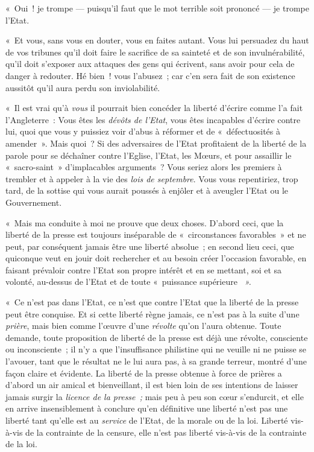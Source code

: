 \documentclass[french,twoside]{book} %
\begin{document}
« Oui ! je trompe — puisqu’il faut que le mot terrible soit prononcé — je trompe l’Etat.\par
« Et vous, sans vous en douter, vous en faites autant. Vous lui persuadez du haut de vos tribunes qu’il doit faire le sacrifice de sa sainteté et de son invulnérabilité, qu’il doit s’exposer aux attaques des gens qui écrivent, sans avoir pour cela de danger à redouter. Hé bien ! vous l’abusez ; car c’en sera fait de son existence aussitôt qu’il aura perdu son inviolabilité.\par
« Il est vrai qu’à \emph{vous} il pourrait bien concéder la liberté d’écrire comme l’a fait l’Angleterre : Vous êtes les \emph{dévôts de l’Etat}, vous êtes incapables d’écrire contre lui, quoi que vous y puissiez voir d’abus à réformer et de « défectuosités à amender ». Mais quoi ? Si des adversaires de l’Etat profitaient de la liberté de la parole pour se déchaîner contre l’Eglise, l’Etat, les Mœurs, et pour assaillir le « sacro-saint » d’implacables arguments ? Vous seriez alors les premiers à trembler et à appeler à la vie des \emph{lois de septembre}. Vous vous repentiriez, trop tard, de la sottise qui vous aurait poussés à enjôler et à aveugler l’Etat ou le Gouvernement.\par
« Mais ma conduite à moi ne prouve que deux choses. D’abord ceci, que la liberté de la presse est toujours inséparable de « circonstances favorables » et ne peut, par conséquent jamais être une liberté absolue ; en second lieu ceci, que quiconque veut en jouir doit rechercher et au besoin créer l’occasion favorable, en faisant prévaloir contre l’Etat son propre  intérêt et en se mettant, soi et sa volonté, au-dessus de l’Etat et de toute « puissance supérieure \emph{ ».}\par
« Ce n’est pas dans l’Etat, ce n’est que contre l’Etat que la liberté de la presse peut être conquise. Et si cette liberté règne jamais, ce n’est pas à la suite d’une \emph{prière}, mais bien comme l’œuvre d’une \emph{révolte }qu’on l’aura obtenue. Toute demande, toute proposition de liberté de la presse est déjà une révolte, consciente ou inconsciente ; il n’y a que l’insuffisance philistine qui ne veuille ni ne puisse se l’avouer, tant que le résultat ne le lui aura pas, à sa grande terreur, montré d’une façon claire et évidente. La liberté de la presse obtenue à force de prières a d’abord un air amical et bienveillant, il est bien loin de ses intentions de laisser jamais surgir la \emph{licence de la presse ;} mais peu à peu son cœur s’endurcit, et elle en arrive insensiblement à conclure qu’en définitive une liberté n’est pas une liberté tant qu’elle est au \emph{service} de l’Etat, de la morale ou de la loi. Liberté vis-à-vis de la contrainte de la censure, elle n’est pas liberté vis-à-vis de la contrainte de la loi.\par
\end{document}
